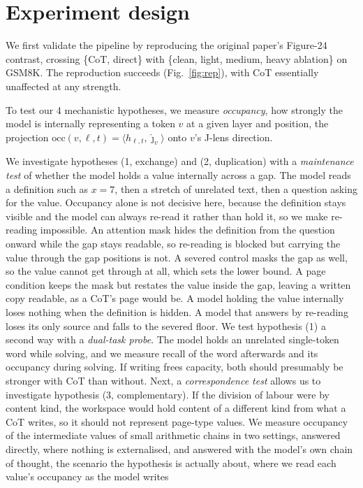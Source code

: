 \documentclass[10pt,a4paper]{article}
\begin{document}
\section{Experiment design}
We first validate the pipeline by reproducing the original paper's Figure-24 contrast, crossing
\{CoT, direct\} with \{clean, light, medium, heavy ablation\} on GSM8K. The reproduction succeeds
(Fig.~\ref{fig:rep}), with CoT essentially unaffected at any strength.

To test our 4 mechanistic hypotheses, we measure \emph{occupancy}, how strongly the model
is internally representing a token $v$ at a given layer and position, the projection
$\mathrm{occ}(v,\ell,t)=\langle h_{\ell,t},\hat{\jmath}_v\rangle$ onto $v$'s J-lens
direction.

We investigate hypotheses (1, exchange) and (2, duplication) with a \emph{maintenance
test} of whether the model holds a value internally across a gap. The model reads a
definition such as $x=7$, then a stretch of unrelated text, then a question asking for
the value. Occupancy alone is not decisive here, because the definition stays
visible and the model can always re-read it rather than hold it, so we make re-reading impossible. An attention mask hides the definition from
the question onward while the gap stays readable, so re-reading is blocked but carrying
the value through the gap positions is not. A severed control masks the gap as well,
so the value cannot get through at all, which sets the lower bound. A page condition
keeps the mask but restates the value inside the gap, leaving a written copy readable,
as a CoT's page would be. A model holding the value internally loses nothing when the
definition is hidden. A model that answers by re-reading loses its only source and
falls to the severed floor.  We test hypothesis (1) a second way with a \emph{dual-task probe}. The model
holds an unrelated single-token word while solving, and we measure recall of the
word afterwards and its occupancy during solving. If writing frees capacity, both
should presumably be stronger with CoT than without. Next, a \emph{correspondence test}
allows us to investigate hypothesis (3, complementary). If the division of labour were
by content kind, the workspace would hold content of a different kind from what a CoT
writes, so it should not represent page-type values. We measure occupancy of the intermediate values of
small arithmetic chains in two settings, answered directly, where nothing is
externalised, and answered with the model's own chain of thought, the scenario the
hypothesis is actually about, where we read each value's occupancy as the model writes
\end{document}
